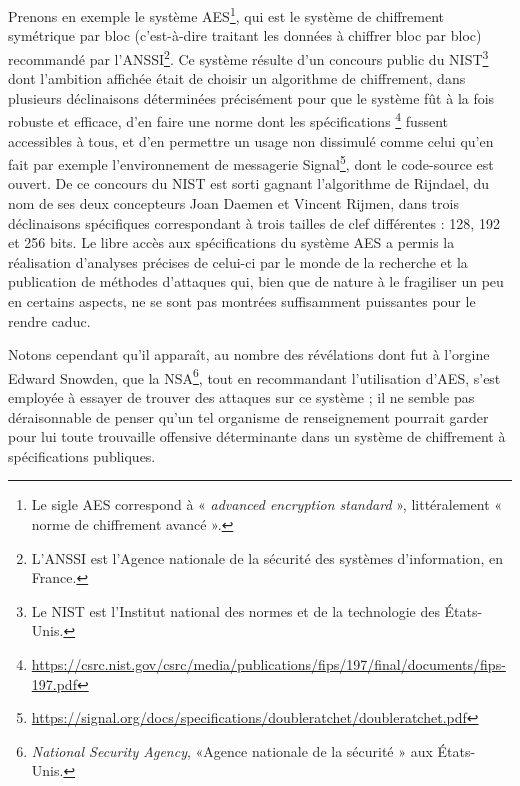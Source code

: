 Prenons en exemple le système AES\footnote{Le sigle AES correspond à « \emph{advanced encryption
standard} », littéralement « norme de chiffrement avancé ».}, qui est le système de chiffrement
symétrique par bloc (c’est-à-dire traitant les données à chiffrer bloc par bloc) recommandé par
l’ANSSI\footnote{L’ANSSI est l’Agence nationale de la sécurité des systèmes d’information, en
France.}.
Ce système résulte d’un concours public du NIST\footnote{Le NIST est l’Institut national des normes
et de la technologie des États-Unis.} dont l’ambition affichée était de choisir un algorithme de
chiffrement, dans plusieurs déclinaisons déterminées précisément pour que le système fût à la fois
robuste et efficace, d’en faire une norme dont les spécifications%
\footnote{\url{https://csrc.nist.gov/csrc/media/publications/fips/197/final/documents/fips-197.pdf}}
fussent accessibles à tous, et d’en permettre un usage non dissimulé comme celui qu’en fait par
exemple l’environnement de messagerie
Signal\footnote{\url{https://signal.org/docs/specifications/doubleratchet/doubleratchet.pdf}}, dont le
code-source est ouvert.
De ce concours du NIST est sorti gagnant l’algorithme de Rijndael, du nom de ses deux concepteurs
Joan Daemen et Vincent Rijmen, dans trois déclinaisons spécifiques correspondant à trois tailles de
clef différentes : 128, 192 et 256 bits. 
Le libre accès aux spécifications du système AES a permis la réalisation d’analyses précises de
celui-ci par le monde de la recherche et la publication de méthodes d’attaques qui, bien que de
nature à le fragiliser un peu en certains aspects, ne se sont pas montrées suffisamment
puissantes pour le rendre caduc.

Notons cependant qu’il apparaît, au nombre des révélations dont fut à l’orgine Edward Snowden, que
la NSA\footnote{\emph{National Security Agency}, «Agence nationale de la sécurité » aux États-Unis.},
tout en recommandant l’utilisation d’AES, s’est employée à essayer de trouver des attaques sur ce
système ; il ne semble pas déraisonnable de penser qu’un tel organisme de renseignement pourrait
garder pour lui toute trouvaille offensive déterminante dans un système de chiffrement à
spécifications publiques.

